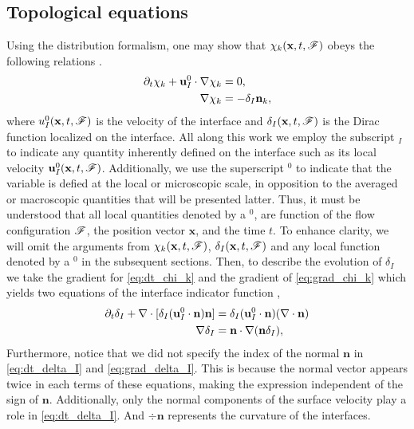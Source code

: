 \subsection{Topological equations}
Using the distribution formalism, one may show that $\chi_k(\textbf{x},t,\mathscr{F})$ obeys the following relations \citep{drew1983mathematical,orlando2023evolution}. 
\begin{align}
    \partial_t \chi_k
    + \textbf{u}_I^0 \cdot \mathbf{\nabla} \chi_k
    &= 0,
    \label{eq:dt_chi_k}\\
    \label{eq:grad_chi_k}
    \mathbf{\nabla} \chi_k
    &= - \delta_I \textbf{n}_k, 
\end{align}
where $u^0_I(\textbf{x},t,\mathscr{F})$ is the velocity of the interface and $\delta_I(\textbf{x},t,\mathscr{F})$ is the Dirac function localized on the interface.
All along this work we employ the subscript $_I$ to indicate any quantity inherently defined on the interface such as its local velocity $\textbf{u}_I^0(\textbf{x},t,\mathscr{F})$. 
Additionally, we use the superscript $^0$ to indicate that the variable is defied at the local or microscopic scale, in opposition to the averaged or macroscopic quantities that will be presented latter. 
Thus, it must be understood that all local quantities denoted by a $^0$, are function of the flow configuration $\mathscr{F}$, the position vector $\textbf{x}$, and the time $t$. 
To enhance clarity, we will omit the arguments from $\chi_k(\textbf{x},t,\mathscr{F})$, $\delta_I(\textbf{x},t,\mathscr{F})$ and any local function denoted by a $^0$ in the subsequent sections.
Then, to describe the evolution of $\delta_I$ we take the gradient for \ref{eq:dt_chi_k} and the gradient of \ref{eq:grad_chi_k} which yields two equations of the interface indicator function \citep{marle1982macroscopic,morel2007surface,orlando2023evolution},
\begin{align}
    \partial_t \delta_I
    + \mathbf{\nabla}\cdot [\delta_I (\textbf{u}_I^0\cdot \textbf{n}) \textbf{n}]
    &= \delta_I (\textbf{u}_I^0 \cdot \textbf{n})(\mathbf{\nabla}\cdot\textbf{n})
    \label{eq:dt_delta_I}\\
    \mathbf{\nabla}\delta_I 
    &= \textbf{n} \cdot \mathbf{\nabla} (\textbf{n} \delta_I),
    \label{eq:grad_delta_I}
\end{align}
Furthermore, notice that we did not specify the index of the normal $\textbf{n}$ in \ref{eq:dt_delta_I} and \ref{eq:grad_delta_I}. 
This is because the normal vector appears twice in each terms of these equations, making the expression independent of the sign of $\textbf{n}$.
Additionally, only the normal components of the surface velocity play a role in \ref{eq:dt_delta_I}. 
And $\div \textbf{n}$ represents the curvature of the interfaces. 


